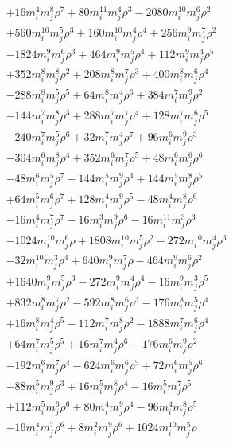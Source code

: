 {\begin{align*}
&+16m_i^{4} m_j^{8} \rho^{7}+80m_i^{11} m_j^{4} \rho^{3}-2080m_i^{10} m_j^{6} \rho^{2}\\
&+560m_i^{10} m_j^{5} \rho^{3}+160m_i^{10} m_j^{4} \rho^{4}+256m_i^{9} m_j^{7} \rho^{2}\\
&-1824m_i^{9} m_j^{6} \rho^{3}+464m_i^{9} m_j^{5} \rho^{4}+112m_i^{9} m_j^{4} \rho^{5}\\
&+352m_i^{8} m_j^{8} \rho^{2}+208m_i^{8} m_j^{7} \rho^{3}+400m_i^{8} m_j^{6} \rho^{4}\\
&-288m_i^{8} m_j^{5} \rho^{5}+64m_i^{8} m_j^{4} \rho^{6}+384m_i^{7} m_j^{9} \rho^{2}\\
&-144m_i^{7} m_j^{8} \rho^{3}+288m_i^{7} m_j^{7} \rho^{4}+128m_i^{7} m_j^{6} \rho^{5}\\
&-240m_i^{7} m_j^{5} \rho^{6}+32m_i^{7} m_j^{4} \rho^{7}+96m_i^{6} m_j^{9} \rho^{3}\\
&-304m_i^{6} m_j^{8} \rho^{4}+352m_i^{6} m_j^{7} \rho^{5}+48m_i^{6} m_j^{6} \rho^{6}\\
&-48m_i^{6} m_j^{5} \rho^{7}-144m_i^{5} m_j^{9} \rho^{4}+144m_i^{5} m_j^{8} \rho^{5}\\
&+64m_i^{5} m_j^{6} \rho^{7}+128m_i^{4} m_j^{9} \rho^{5}-48m_i^{4} m_j^{8} \rho^{6}\\
&-16m_i^{4} m_j^{7} \rho^{7}-16m_i^{3} m_j^{9} \rho^{6}-16m_i^{11} m_j^{3} \rho^{3}\\
&-1024m_i^{10} m_j^{6} \rho+1808m_i^{10} m_j^{5} \rho^{2}-272m_i^{10} m_j^{4} \rho^{3}\\
&-32m_i^{10} m_j^{3} \rho^{4}+640m_i^{9} m_j^{7} \rho-464m_i^{9} m_j^{6} \rho^{2}\\
&+1640m_i^{9} m_j^{5} \rho^{3}-272m_i^{9} m_j^{4} \rho^{4}-16m_i^{9} m_j^{3} \rho^{5}\\
&+832m_i^{8} m_j^{7} \rho^{2}-592m_i^{8} m_j^{6} \rho^{3}-176m_i^{8} m_j^{5} \rho^{4}\\
&+16m_i^{8} m_j^{4} \rho^{5}-112m_i^{7} m_j^{8} \rho^{2}-1888m_i^{7} m_j^{6} \rho^{4}\\
&+64m_i^{7} m_j^{5} \rho^{5}+16m_i^{7} m_j^{4} \rho^{6}-176m_i^{6} m_j^{9} \rho^{2}\\
&-192m_i^{6} m_j^{7} \rho^{4}-624m_i^{6} m_j^{6} \rho^{5}+72m_i^{6} m_j^{5} \rho^{6}\\
&-88m_i^{5} m_j^{9} \rho^{3}+16m_i^{5} m_j^{8} \rho^{4}-16m_i^{5} m_j^{7} \rho^{5}\\
&+112m_i^{5} m_j^{6} \rho^{6}+80m_i^{4} m_j^{9} \rho^{4}-96m_i^{4} m_j^{8} \rho^{5}\\
&-16m_i^{4} m_j^{7} \rho^{6}+8m_i^{2} m_j^{9} \rho^{6}+1024m_i^{10} m_j^{5} \rho\\

\end{align*}}
